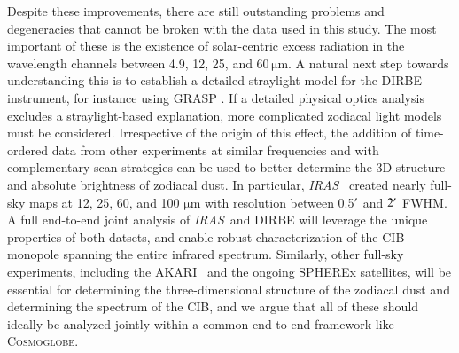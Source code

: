 \documentclass{aa}
\def\Cosmoglobe{\textsc{Cosmoglobe}}
\def\Cosmoglobe{\textsc{Cosmoglobe}}
\def\AKARI{\textrm{{AKARI}}}
\def\IRAS{\textit{{IRAS}}}
\begin{document}
Despite these improvements, there are still outstanding problems and degeneracies that cannot be broken with the data used in this study. The most important of these is the existence of solar-centric excess radiation in the wavelength channels between 4.9, 12, 25, and 60\,$\mathrm{\mu m}$. A natural next step towards understanding this is to establish a detailed straylight model for the DIRBE instrument, for instance using GRASP \citep{grasp}. If a detailed physical optics analysis excludes a straylight-based explanation, more complicated zodiacal light models must be considered. Irrespective of the origin of this effect, the addition of time-ordered data from other experiments at similar frequencies and with complementary scan strategies can be used to better determine the 3D structure and absolute brightness of zodiacal dust. In particular, \IRAS\ \citep{boggess92} created nearly full-sky maps at 12, 25, 60, and 100 $\mathrm{\mu m}$ with resolution between 0.5$\arcm$ and $2\arcm$ FWHM. A full end-to-end joint analysis of \IRAS\ and DIRBE will leverage the unique properties of both datsets, and enable robust characterization of the CIB monopole spanning the entire infrared spectrum. Similarly, other full-sky experiments, including the \AKARI\ \citep{murakami:2007} and the ongoing SPHEREx \citep{dore:2014} satellites, will be essential for determining the three-dimensional structure of the zodiacal dust and determining the spectrum of the CIB, and we argue that all of these should ideally be analyzed jointly within a common end-to-end framework like \Cosmoglobe. 
\end{document}
